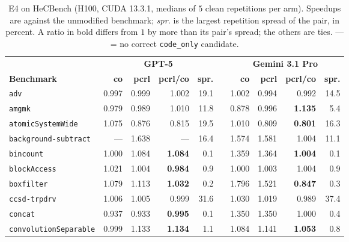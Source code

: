 \begin{table}[t]
\centering
\footnotesize
\caption{E4 on HeCBench (H100, CUDA 13.3.1, medians of $5$ clean repetitions per arm). Speedups are
  against the unmodified benchmark; \emph{spr.} is the largest repetition spread of the pair, in
  percent. A ratio in bold differs from $1$ by more than its pair's spread; the others are ties.
  --- = no correct \texttt{code\_only} candidate.}
\label{tab:profablhec}
\setlength{\tabcolsep}{2.5pt}
\begin{tabular}{@{}lrrrrcrrrr@{}}
\toprule
 & \multicolumn{4}{c}{\textbf{GPT-5}} && \multicolumn{4}{c}{\textbf{Gemini 3.1 Pro}} \\
\cmidrule(lr){2-5}\cmidrule(lr){7-10}
\textbf{Benchmark} & \textbf{co} & \textbf{pcrl} & \textbf{pcrl/co} & \textbf{spr.} &&
  \textbf{co} & \textbf{pcrl} & \textbf{pcrl/co} & \textbf{spr.} \\
\midrule
\texttt{adv}                  & 0.997 & 0.999 & 1.002 & 19.1 && 1.002 & 0.994 & 0.992 & 14.5 \\
\texttt{amgmk}                & 0.979 & 0.989 & 1.010 & 11.8 && 0.878 & 0.996 & \textbf{1.135} & 5.4 \\
\texttt{atomicSystemWide}     & 1.075 & 0.876 & 0.815 & 19.5 && 1.010 & 0.809 & \textbf{0.801} & 16.3 \\
\texttt{background-subtract}  & ---   & 1.638 & ---   & 16.4 && 1.574 & 1.581 & 1.004 & 11.1 \\
\texttt{bincount}             & 1.000 & 1.084 & \textbf{1.084} & 0.1 && 1.359 & 1.364 & \textbf{1.004} & 0.1 \\
\texttt{blockAccess}          & 1.021 & 1.004 & \textbf{0.984} & 0.9 && 1.000 & 1.003 & 1.004 & 0.9 \\
\texttt{boxfilter}            & 1.079 & 1.113 & \textbf{1.032} & 0.2 && 1.796 & 1.521 & \textbf{0.847} & 0.3 \\
\texttt{ccsd-trpdrv}          & 1.006 & 1.005 & 0.999 & 31.6 && 1.030 & 1.019 & 0.989 & 37.4 \\
\texttt{concat}               & 0.937 & 0.933 & \textbf{0.995} & 0.1 && 1.350 & 1.350 & 1.000 & 0.4 \\
\texttt{convolutionSeparable} & 0.999 & 1.133 & \textbf{1.134} & 1.1 && 1.084 & 1.141 & \textbf{1.053} & 0.8 \\
\bottomrule
\end{tabular}
\end{table}

